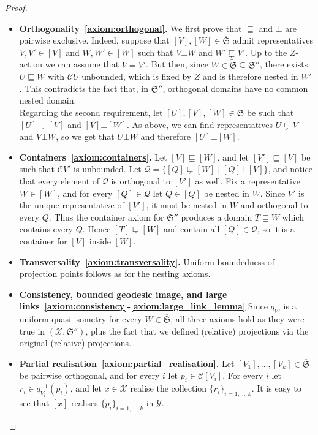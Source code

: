 \documentclass[svgnames]{amsart}
\theoremstyle{plain}
\theoremstyle{definition}
\newcommand{\cal}[1]{\mathcal{#1}}
\newcommand{\frakS}{\mathfrak{S}}
\newcommand{\C}{\cal C}
\newcommand{\nest}{\sqsubseteq}
\newcommand{\propnest}{\sqsubsetneq}
\newcommand{\orth}{\bot}
\newcommand{\ofS}{\overline{\frakS}}
\newcommand{\wfS}{\widetilde{\frakS}}
\begin{document}
\begin{proof}
\begin{itemize}
        \item \textbf{Orthogonality~\ref{axiom:orthogonal}.} We first prove that $\nest$ and $\orth$ are pairwise exclusive. Indeed, suppose that $[V],[W]\in \ofS$ admit representatives $V,V'\in [V]$ and $W,W'\in [W]$ such that $V\orth W$ and $W'\propnest V'$. Up to the $Z$-action we can assume that $V=V'$. But then, since $W\in \wfS\subseteq \frakS''$, there exists $U\nest W$ with $\cal C U$ unbounded, which is fixed by $Z$ and is therefore nested in $W'$. This contradicts the fact that, in $\frakS''$, orthogonal domains have no common nested domain.
        \\
        Regarding the second requirement, let $[U],[V],[W]\in \ofS$ be such that $[U]\propnest [V]$ and $[V]\orth [W]$. As above, we can find representatives $U\propnest V$ and $V\orth W$, so we get that $U\orth W$ and therefore $[U]\orth [W]$.

        \item \textbf{Containers~\ref{axiom:containers}.} Let $[V]\propnest [W]$, and let $[V']\nest [V]$ be such that $\cal C V'$ is unbounded. Let $\cal Q=\{[Q]\propnest [W]\mid [Q]\orth[V]\}$, and notice that every element of $\cal Q$ is orthogonal to $[V']$ as well. Fix a representative $W\in [W]$, and for every $[Q]\in \cal Q$ let $Q\in [Q]$ be nested in $W$. Since $V'$ is the unique representative of $[V']$, it must be nested in $W$ and orthogonal to every $Q$. Thus the container axiom for $\frakS''$ produces a domain $T\propnest W$ which contains every $Q$. Hence $[T]\propnest [W]$ and contain all $[Q]\in \cal Q$, so it is a container for $[V]$ inside $[W]$.

        \item \textbf{Transversality~\ref{axiom:transversality}.} Uniform boundedness of projection points follows as for the nesting axioms.
        
        \item \textbf{Consistency, bounded geodesic image, and large links~\ref{axiom:consistency}-\ref{axiom:large_link_lemma}} Since $q_W$ is a uniform quasi-isometry for every $W\in \ofS$, all three axioms hold as they were true in $(\cal X, \frakS'')$, plus the fact that we defined (relative) projections via the original (relative) projections.
        
        \item \textbf{Partial realisation~\ref{axiom:partial_realisation}.} Let $[V_1],\ldots,[V_k]\in \ofS$ be pairwise orthogonal, and for every $i$ let $p_i\in \C [V_i]$. For every $i$ let $r_i\in q_{V_i}^{-1}(p_i)$, and let $x\in \cal X$ realise the collection $\{r_i\}_{i=1,\ldots, k}$. It is easy to see that $[x]$ realises $\{p_i\}_{i=1,\ldots, k}$ in $\cal Y$.
        

\end{itemize}
\end{proof}
\end{document}
